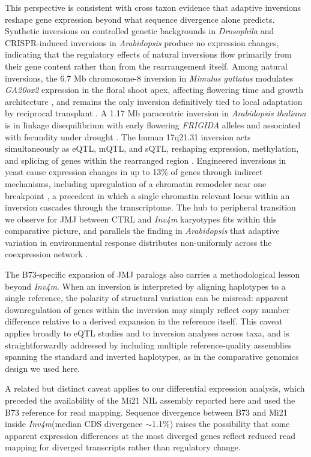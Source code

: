\documentclass[9pt,twocolumn,twoside]{rilabRxiv}
\newcommand{\invfour}{\textit{Inv4m}\xspace}
\begin{document}
This perspective is consistent with cross taxon evidence that adaptive inversions reshape gene expression beyond what sequence divergence alone predicts.
Synthetic inversions on controlled genetic backgrounds in \textit{Drosophila} \citep{said2018} and CRISPR-induced inversions in \textit{Arabidopsis} \citep{khosravi2025} produce no expression changes, indicating that the regulatory effects of natural inversions flow primarily from their gene content rather than from the rearrangement itself.
Among natural inversions, the 6.7 Mb chromosome-8 inversion in \textit{Mimulus guttatus} modulates \textit{GA20ox2} expression in the floral shoot apex, affecting flowering time and growth architecture \citep{kollar2025}, and remains the only inversion definitively tied to local adaptation by reciprocal transplant \citep{lowry2010}.
A 1.17 Mb paracentric inversion in \textit{Arabidopsis thaliana} is in linkage disequilibrium with early flowering \textit{FRIGIDA} alleles and associated with fecundity under drought \citep{fransz2016}.
The human 17q21.31 inversion acts simultaneously as eQTL, mQTL, and sQTL, reshaping expression, methylation, and splicing of genes within the rearranged region \citep{wang2023inversions}.
Engineered inversions in yeast cause expression changes in up to 13\% of genes through indirect mechanisms, including upregulation of a chromatin remodeler near one breakpoint \citep{naseeb2016}, a precedent in which a single chromatin relevant locus within an inversion cascades through the transcriptome.
The hub to peripheral transition we observe for JMJ between CTRL and \invfour karyotypes fits within this comparative picture, and parallels the finding in \textit{Arabidopsis} that adaptive variation in environmental response distributes non-uniformly across the coexpression network \citep{desmarais2017}.
 
The B73-specific expansion of JMJ paralogs also carries a methodological lesson beyond \invfour.
When an inversion is interpreted by aligning haplotypes to a single reference, the polarity of structural variation can be misread: apparent downregulation of genes within the inversion may simply reflect copy number difference relative to a derived expansion in the reference itself.
This caveat applies broadly to eQTL studies and to inversion analyses across taxa, and is straightforwardly addressed by including multiple reference-quality assemblies spanning the standard and inverted haplotypes, as in the comparative genomics design we used here.

A related but distinct caveat applies to our differential expression analysis, which preceded the availability of the Mi21 NIL assembly reported here and used the B73 reference for read mapping.
Sequence divergence between B73 and Mi21 inside \invfour (median CDS divergence $\sim$1.1\%) raises the possibility that some apparent expression differences at the most diverged genes reflect reduced read mapping for diverged transcripts rather than regulatory change.
\end{document}
